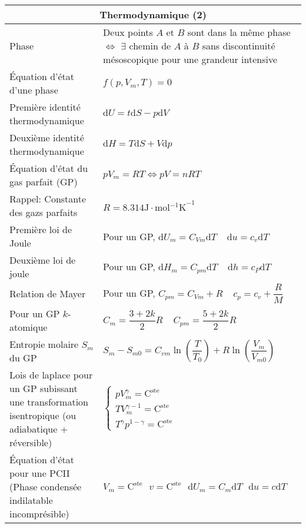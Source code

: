 \documentclass[10pt,a4paper,titlepage,landscape]{article}
\renewcommand{\d}
{
    \mathrm{d}
}
\newcommand{\constant}
{
    \mathrm{C}^{\text{ste}}
}
\renewcommand{\arraystretch}{2}
\begin{document}
\begin{table}[H]
    \centering
    \renewcommand{\arraystretch}{1.5} %
    \setlength{\tabcolsep}{8pt} %
    \begin{tabular}{@{}|p{9cm}|p{10cm}@{}|}
        \multicolumn{2}{c}{\textbf{Thermodynamique (2)}} \\ \hline
            Phase & Deux points $A$ et $B$ sont dans la même phase $\Leftrightarrow$ $\exists$ chemin de $A$ à $B$ sans discontinuité mésoscopique pour une grandeur intensive \\ \hline
            Équation d'état d'une phase & $f\left(p, V_m, T\right) = 0$ \\ \hline
            Première identité thermodynamique & $\d U = t \d S - p\d V$ \\ \hline
            Deuxième identité thermodynamique & $\d H = T \d S + V \d p$ \\ \hline 
            Équation d'état du gas parfait (GP) & $pV_m = RT \Longleftrightarrow pV = nRT$ \\ \hline
            Rappel: Constante des gazs parfaits & $R= 8.314 \unit{\J\cdot\mol^{-1}\kelvin}^{-1}$ \\ \hline
            Première loi de Joule & Pour un GP, $\d U_m  =C_{Vm}\d T \ \ \ \ \ \d u = c_v \d T$ \\ \hline
            Deuxième loi de joule & Pour un GP, $\d H_m = C_{pm} \d T \ \ \ \ \ \d h = c_P \d T$ \\ \hline
            Relation de Mayer & Pour un GP, $C_{pm} = C_{Vm} + R \ \ \ \ \ c_p = c_v + \dfrac{R}{M}$ \\ \hline
            Pour un GP $k$-atomique & $C_m = \dfrac{3 + 2k}{2}R \ \ \ \ \ C_{pm} = \dfrac{5 + 2k}{2}R$ \\ \hline
            Entropie molaire $S_m$ du GP & $S_m - S_{m0} = C_{vm}\ln\left(\dfrac{T}{T_0}\right)+R\ln\left(\dfrac{V_m}{V_{m0}}\right)$ \\ \hline
            Lois de laplace pour un GP subissant une transformation isentropique (ou adiabatique $+$ réversible) & $\left\{\begin{array}{l}pV_m^{\gamma} = \constant \\ TV_m^{\gamma - 1} = \constant \\ T^{\gamma}p^{1-\gamma} = \constant \end{array}\right.$ \\ \hline 
            Équation d'état pour une PCII (Phase condensée indilatable incomprésible) & $V_m = \constant \ \ \ v = \constant \ \ \ \d U_m = C_m\d T \ \ \ \d u = c\d T$ \\ \hline

\end{tabular}
\end{table}
\end{document}
